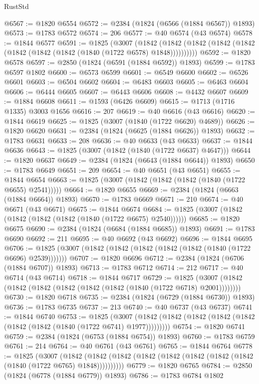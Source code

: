 \begin{lexlean}{RustStd}
\begin{coremodule}
@6567 := @1820 @6554
@6572 := @2384 (@1824 (@6566 (@1884 @6567)) @1893)
@6573 := @1783 @6572
@6574 := 206
@6577 := @40 @6574 (@43 @6574)
@6578 := @1844 @6577
@6591 := @1825
    (@3007
      (@1842 (@1842 (@1842 (@1842 (@1842 (@1842 (@1842 (@1842 (@1840 (@1722 @6578) @1848))))))))))
@6592 := @1820 @6578
@6597 := @2850 (@1824 (@6591 (@1884 @6592)) @1893)
@6599 := @1783 @6597 @1802
@6600 := @6573 @6599
@6601 := @6549 @6600
@6602 := @6526 @6601
@6603 := @6504 @6602
@6604 := @6483 @6603
@6605 := @6463 @6604
@6606 := @6444 @6605
@6607 := @6443 @6606
@6608 := @4432 @6607
@6609 := @1884 @6608
@6611 := @1593 (@6426 @6609)
@6615 := @1713 (@1716 @1335) @3003 @1656
@6616 := 207
@6619 := @40 @6616 (@43 @6616)
@6620 := @1844 @6619
@6625 := @1825 (@3007 (@1840 (@1722 @6620) @4689))
@6626 := @1820 @6620
@6631 := @2384 (@1824 (@6625 (@1884 @6626)) @1893)
@6632 := @1783 @6631
@6633 := 208
@6636 := @40 @6633 (@43 @6633)
@6637 := @1844 @6636
@6643 := @1825 (@3007 (@1842 (@1840 (@1722 @6637) @4647)))
@6644 := @1820 @6637
@6649 := @2384 (@1824 (@6643 (@1884 @6644)) @1893)
@6650 := @1783 @6649
@6651 := 209
@6654 := @40 @6651 (@43 @6651)
@6655 := @1844 @6654
@6663 := @1825 (@3007 (@1842 (@1842 (@1842 (@1840 (@1722 @6655) @2541)))))
@6664 := @1820 @6655
@6669 := @2384 (@1824 (@6663 (@1884 @6664)) @1893)
@6670 := @1783 @6669
@6671 := 210
@6674 := @40 @6671 (@43 @6671)
@6675 := @1844 @6674
@6684 := @1825 (@3007 (@1842 (@1842 (@1842 (@1842 (@1840 (@1722 @6675) @2540))))))
@6685 := @1820 @6675
@6690 := @2384 (@1824 (@6684 (@1884 @6685)) @1893)
@6691 := @1783 @6690
@6692 := 211
@6695 := @40 @6692 (@43 @6692)
@6696 := @1844 @6695
@6706 := @1825 (@3007 (@1842 (@1842 (@1842 (@1842 (@1842 (@1840 (@1722 @6696) @2539)))))))
@6707 := @1820 @6696
@6712 := @2384 (@1824 (@6706 (@1884 @6707)) @1893)
@6713 := @1783 @6712
@6714 := 212
@6717 := @40 @6714 (@43 @6714)
@6718 := @1844 @6717
@6729 := @1825 (@3007 (@1842 (@1842 (@1842 (@1842 (@1842 (@1842 (@1840 (@1722 @6718) @2001))))))))
@6730 := @1820 @6718
@6735 := @2384 (@1824 (@6729 (@1884 @6730)) @1893)
@6736 := @1783 @6735
@6737 := 213
@6740 := @40 @6737 (@43 @6737)
@6741 := @1844 @6740
@6753 := @1825
    (@3007 (@1842 (@1842 (@1842 (@1842 (@1842 (@1842 (@1842 (@1840 (@1722 @6741) @1977)))))))))
@6754 := @1820 @6741
@6759 := @2384 (@1824 (@6753 (@1884 @6754)) @1893)
@6760 := @1783 @6759
@6761 := 214
@6764 := @40 @6761 (@43 @6761)
@6765 := @1844 @6764
@6778 := @1825
    (@3007
      (@1842 (@1842 (@1842 (@1842 (@1842 (@1842 (@1842 (@1842 (@1840 (@1722 @6765) @1848))))))))))
@6779 := @1820 @6765
@6784 := @2850 (@1824 (@6778 (@1884 @6779)) @1893)
@6786 := @1783 @6784 @1802

\end{coremodule}
\end{lexlean}
